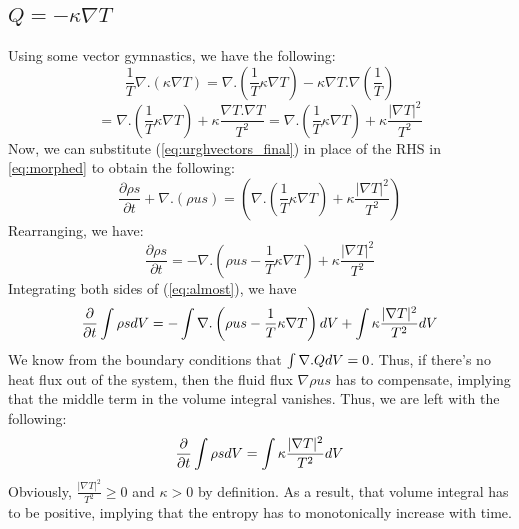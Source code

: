 \documentclass[english]{article}
\begin{document}
\subsection{$Q = -\kappa \nabla T$}
Using some vector gymnastics, we have the following:
$$
	\frac{1}{T}\nabla.(\kappa\nabla T) = 
	\nabla . (\frac{1}{T}\kappa \nabla T) -
	\kappa \nabla T.\nabla\left(\frac{1}{T}\right)
$$
\begin{equation}
	= \nabla . (\frac{1}{T}\kappa \nabla T) + 
	\kappa \frac{\nabla T.\nabla T}{T^{2}}
	= \nabla . (\frac{1}{T}\kappa \nabla T) + 
	\kappa \frac{|\nabla T|^{2}}{T^{2}}
	\label{eq:urghvectors_final}
\end{equation}
Now, we can substitute (\ref{eq:urghvectors_final}) in place of the RHS in
\ref{eq:morphed} to obtain the following:
$$
	\frac{\partial \rho s}{\partial t}+\nabla.(\rho us)=\left(
	\nabla . (\frac{1}{T}\kappa \nabla T) + 
	\kappa \frac{|\nabla T|^{2}}{T^{2}}
	\right)
$$
Rearranging, we have:
\begin{equation}
	\frac{\partial \rho s}{\partial t}=
	-\nabla.\left(\rho us - \frac{1}{T}\kappa \nabla T \right) 
	+\kappa \frac{|\nabla T|^{2}}{T^{2}}
	\label{eq:almost}
\end{equation}
Integrating both sides of (\ref{eq:almost}), we have
$$
	\frac{\partial}{\partial t} \intop \rho sdV=
	-\intop \nabla.\left(\rho us - \frac{1}{T}\kappa \nabla T \right) dV
	+\intop\kappa \frac{|\nabla T|^{2}}{T^{2}}dV
$$
We know from the boundary conditions that $\intop \nabla.QdV = 0$. Thus,
if there's no heat flux out of the system, then the fluid flux 
$\nabla \rho us$ has to compensate, implying that the middle term in the
volume integral vanishes.
Thus, we are left with the following:
\begin{equation}
	\frac{\partial}{\partial t} \intop \rho sdV=
	\intop\kappa \frac{|\nabla T|^{2}}{T^{2}}dV
	\label{eq:done}
\end{equation}
Obviously, $\frac{|\nabla T|^{2}}{T^{2}} \geq 0$ and $\kappa >0$ by 
definition. As a result, that volume integral has to be positive, implying
that the entropy has to monotonically increase with time.
\end{document}
